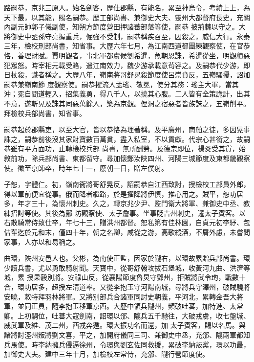 \begin{pinyinscope}
 路嗣恭，京兆三原人。始名劍客，歷仕郡縣，有能名，累至神烏令，考績上上，為天下最，以其能，賜名嗣恭。歷工部尚書、兼御史大夫、靈州大都督府長史，充關內副元帥郭子儀副使，知朔方節度營田押諸蕃部落等使，嗣恭
 披荊棘以守之。大將御史中丞孫守亮握重兵，倔強不受制，嗣恭稱疾召至，因殺之，威信大行。永泰三年，檢校刑部尚書，知省事。大歷六年七月，為江南西道都團練觀察使，在官恭恪，善理財賦。賈明觀者，事北軍都虞候劉希暹，魚朝恩誅，希暹從坐，明觀積惡犯眾怒。時宰相元載受賂，遣江南效力，魏少游承載意茍容之。及嗣恭代少游，即日杖殺，識者稱之。大歷八年，嶺南將哥舒晃殺節度使呂崇賁反，五嶺騷擾，詔加嗣恭兼嶺南節
 度觀察使。嗣恭擢流人孟瑤、敬冕，使分其務：瑤主大軍，當其沖；冕自間道輕入，招集義勇，得八千人，以撓其心腹。二人皆有全策詭計，出其不意，遂斬晃及誅其同惡萬餘人，築為京觀。俚洞之宿惡者皆族誅之，五嶺削平。拜檢校兵部尚書，知省事。



 嗣恭起於郡縣吏，以至大官，皆以恭恪為理著稱。及平廣州，商舶之徒，多因晃事誅之，嗣恭前後沒其家財寶數百萬貫，盡入私室，不以貢獻。代宗心甚銜之，故嗣恭雖有平方面功，止轉檢校兵部
 尚書，無所酬勞。及德宗即位，楊炎受其貨，始敘前功，除兵部尚書、東都留守。尋加懷鄭汝陜四州、河陽三城節度及東都畿觀察使。徵至京師卒，時年七十一，廢朝一日，贈左僕射。



 子恕，字體仁。初，嶺南衙將哥舒晃反，詔嗣恭自江西致討，授檢校工部員外郎，得以軍前便宜從事。俄而降者繼路，於是擢降將伊慎，推心用之。賊平，恕功居多，年才三十，為懷州刺史。久之，轉京兆少尹、監門衛大將軍、兼御史中丞、教練招討等使。其後為鄜
 坊觀察使、太子詹事。坐事貶吉州刺史，遷太子賓客。以右散騎常侍致仕卒，年七十三，贈洪州都督。恕私第有佳林園，自貞元初李紓、包佶輩迄於元和末，僅四十年，朝之名卿，咸從之游，高歌縱酒，不屑外慮，未嘗問家事，人亦以和易稱之。



 曲環，陜州安邑人也。父彬，為南使正監，因家於隴右，以環故累贈兵部尚書。環少讀兵書，尤以勇敢騎射聞。天寶中，從哥舒翰攻拔石堡城，收黃河九曲、洪濟等城，累
 授果毅別將。安祿山反，從襄陽節度魯炅守鄧州，拒賊將武令珣，戰數十合，環功居多，超授左清道率。又從李抱玉守河陽南城，尋將兵守澤州，破賊驍將安曉，敕特拜羽林將軍。又將別部兵合諸軍同討史朝義，平河北，累轉金吾大將軍，並同正員，隨李抱玉移軍京西。大歷中領兵隴州，頻破吐蕃，加特進、太常卿。上初嗣位，吐蕃大寇劍南，詔環以邠、隴兵五千馳往，大破戎虜，收七盤城、威武軍及維、茂二州，西戎奔遁。環大振功名而還，加
 太子賓客，賜以名馬。與諸將討涇州叛將劉文喜，平之，加開府儀同三司、兼御史中丞，充邠、隴兩軍都知兵馬使。時李納擁兵侵逼徐州，令環與劉玄佐同救援，累破李納叛黨，環以功最，加御史大夫。建中三年十月，加檢校左常侍，充邠、隴行營節度使。




\end{pinyinscope}
